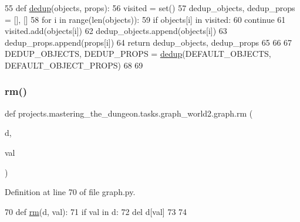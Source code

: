 \begin{DoxyCode}
55 \textcolor{keyword}{def }\hyperlink{namespaceprojects_1_1mastering__the__dungeon_1_1tasks_1_1graph__world2_1_1graph_aacedda0df87e368472433505f6775190}{dedup}(objects, props):
56     visited = set()
57     dedup\_objects, dedup\_props = [], []
58     \textcolor{keywordflow}{for} i \textcolor{keywordflow}{in} range(len(objects)):
59         \textcolor{keywordflow}{if} objects[i] \textcolor{keywordflow}{in} visited:
60             \textcolor{keywordflow}{continue}
61         visited.add(objects[i])
62         dedup\_objects.append(objects[i])
63         dedup\_props.append(props[i])
64     \textcolor{keywordflow}{return} dedup\_objects, dedup\_props
65 
66 
67 DEDUP\_OBJECTS, DEDUP\_PROPS = \hyperlink{namespaceprojects_1_1mastering__the__dungeon_1_1tasks_1_1graph__world2_1_1graph_aacedda0df87e368472433505f6775190}{dedup}(DEFAULT\_OBJECTS, DEFAULT\_OBJECT\_PROPS)
68 
69 
\end{DoxyCode}
\mbox{\label{namespaceprojects_1_1mastering__the__dungeon_1_1tasks_1_1graph__world2_1_1graph_a0da062d03bdfbab1c65ea71371c0c469}} 
\subsubsection{\texorpdfstring{rm()}{rm()}}
{\footnotesize\ttfamily def projects.\+mastering\+\_\+the\+\_\+dungeon.\+tasks.\+graph\+\_\+world2.\+graph.\+rm (\begin{DoxyParamCaption}\item[{}]{d,  }\item[{}]{val }\end{DoxyParamCaption})}



Definition at line 70 of file graph.\+py.


\begin{DoxyCode}
70 \textcolor{keyword}{def }\hyperlink{namespaceprojects_1_1mastering__the__dungeon_1_1tasks_1_1graph__world2_1_1graph_a0da062d03bdfbab1c65ea71371c0c469}{rm}(d, val):
71     \textcolor{keywordflow}{if} val \textcolor{keywordflow}{in} d:
72         del d[val]
73 
74 
\end{DoxyCode}


